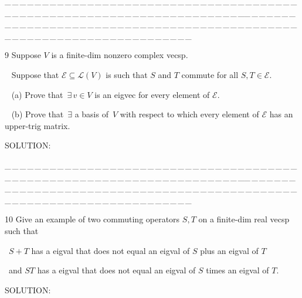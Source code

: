\documentclass[a4paper, 11pt, UTF8]{article}
\def\Lm{\mathcal{L}}
\begin{document}
\begin{large}
\par
{\tiny \_\,\_\,\_\,\_\,\_\,\_\,\_\,\_\,\_\,\_\,\_\,\_\,\_\,\_\,\_\,\_\,\_\,\_\,\_\,\_\,\_\,\_\,\_\,\_\,\_\,\_\,\_\,\_\,\_\,\_\,\_\,\_\,\_\,\_\,\_\,\_\,\_\,\_\,\_\,\_\,\_\,\_\,\_\,\_\,\_\,\_\,\_\,\_\,\_\,\_\,\_\,\_\,\_\,\_\,\_\,\_\,\_\,\_\,\_\,\_\,\_\,\_\,\_\,\_\,\_\,\_\,\_\,\_\,\_\,\_\,\_\_\,\_\,\_\,\_\,\_\,\_\,\_\,\_\,\_\,\_\,\_\,\_\,\_\,\_\,\_\,\_\,\_\,\_\,\_\,\_\,\_\,\_\,\_\,\_\,\_\,\_\,\_\,\_\,\_\,\_\,\_\,\_\,\_\,\_\,\_\,\_\,\_\,\_\,\_\,\_\,\_\,\_\,\_\,\_\,\_\,\_\,\_\,\_\,\_\,\_\,\_\,\_\,\_\,\_\,\_\,\_\,\_\,\_\,\_\,\_\,\_\,\_\,\_\,\_\,\_\,\_\,\_\,\_\,\_\,\_\,\_}\par

{\timesbf\Large 9} {\timessl\Large 
Suppose $V$ is a finite-dim nonzero complex vecsp.}\par\,\,\,
{\timessl\Large Suppose that $\mathcal{E}\subseteq\Lm(V)$ is such that $S$ and $T$ commute for all $S, T\in\mathcal{E}$.
}\par\,\,\,
(a) {\timessl\Large Prove that $\,\exists\,v\in V$ is an eigvec for every element of $\mathcal{E}$.}\par\,\,\,
(b) {\timessl\Large Prove that $\,\exists$ a basis of \,$V$ with respect to which every element of $\mathcal{E}$ has an upper-trig matrix.}\par
{\timesbf S\footnotesize{OLUTION:}}\par\quad

\par
{\tiny \_\,\_\,\_\,\_\,\_\,\_\,\_\,\_\,\_\,\_\,\_\,\_\,\_\,\_\,\_\,\_\,\_\,\_\,\_\,\_\,\_\,\_\,\_\,\_\,\_\,\_\,\_\,\_\,\_\,\_\,\_\,\_\,\_\,\_\,\_\,\_\,\_\,\_\,\_\,\_\,\_\,\_\,\_\,\_\,\_\,\_\,\_\,\_\,\_\,\_\,\_\,\_\,\_\,\_\,\_\,\_\,\_\,\_\,\_\,\_\,\_\,\_\,\_\,\_\,\_\,\_\,\_\,\_\,\_\,\_\,\_\_\,\_\,\_\,\_\,\_\,\_\,\_\,\_\,\_\,\_\,\_\,\_\,\_\,\_\,\_\,\_\,\_\,\_\,\_\,\_\,\_\,\_\,\_\,\_\,\_\,\_\,\_\,\_\,\_\,\_\,\_\,\_\,\_\,\_\,\_\,\_\,\_\,\_\,\_\,\_\,\_\,\_\,\_\,\_\,\_\,\_\,\_\,\_\,\_\,\_\,\_\,\_\,\_\,\_\,\_\,\_\,\_\,\_\,\_\,\_\,\_\,\_\,\_\,\_\,\_\,\_\,\_\,\_\,\_\,\_\,\_}\par

{\timesbf\Large 10} {\timessl\Large 
Give an example of two commuting operators $S, T$ on a finite-dim real vecsp such that}\par\quad\,
{\timessl\Large $S + T$ has a eigval that does not equal an eigval of $S$ plus an eigval of $T$}\par\quad\,
{\timessl\Large and $ST$ has a eigval that does not equal an eigval of $S$ times an eigval of $T$.
}\par
{\timesbf S\footnotesize{OLUTION:}}\par\quad


\end{large}
\end{document}
